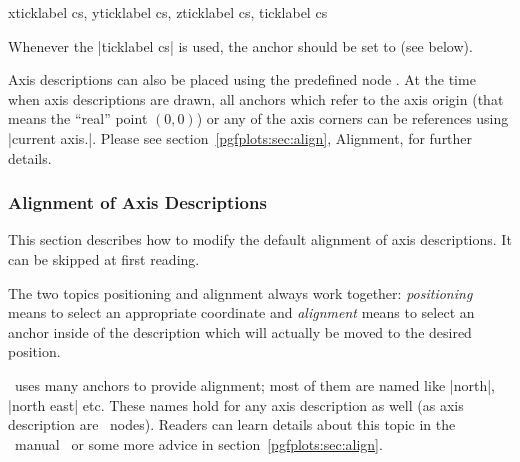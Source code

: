 \begin{coordinatesystemlist}{%
	xticklabel cs,%
	yticklabel cs,%
	zticklabel cs,
	ticklabel cs}
\begin{codeexample}[width=4cm]
\end{codeexample}

	Whenever the |ticklabel cs| is used, the anchor should be set to  (see below).
\end{coordinatesystemlist}


Axis descriptions can also be placed using the predefined node . At the time when axis descriptions are drawn, all anchors which refer to the axis origin (that means the ``real'' point $(0,0)$) or any of the axis corners can be references using |current axis.|. Please see section~\ref{pgfplots:sec:align}, Alignment, for further details.

\subsubsection{Alignment of Axis Descriptions}
This section describes how to modify the default alignment of axis descriptions. It can be skipped at first reading.

The two topics positioning and alignment always work together: \emph{positioning} means to select an appropriate coordinate and \emph{alignment} means to select an anchor inside of the description which will actually be moved to the desired position.

\Tikz\ uses many anchors to provide alignment; most of them are named like |north|, |north east| etc. These names hold for any axis description as well (as axis description are \Tikz\ nodes). Readers can learn details about this topic in the \Tikz\ manual~\cite{tikz} or some more advice in section~\ref{pgfplots:sec:align}.

